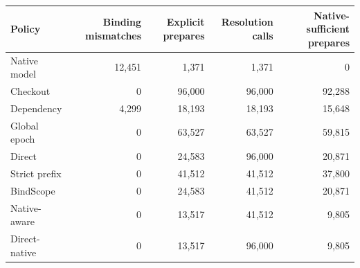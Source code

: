 \begin{tabular}{lrrrr}\toprule
Policy & Binding mismatches & Explicit prepares & Resolution calls & Native-sufficient prepares\\\midrule
Native model & 12,451 & 1,371 & 1,371 & 0 \\
Checkout & 0 & 96,000 & 96,000 & 92,288 \\
Dependency & 4,299 & 18,193 & 18,193 & 15,648 \\
Global epoch & 0 & 63,527 & 63,527 & 59,815 \\
Direct & 0 & 24,583 & 96,000 & 20,871 \\
Strict prefix & 0 & 41,512 & 41,512 & 37,800 \\
BindScope & 0 & 24,583 & 41,512 & 20,871 \\
Native-aware & 0 & 13,517 & 41,512 & 9,805 \\
Direct-native & 0 & 13,517 & 96,000 & 9,805 \\
\bottomrule\end{tabular}
